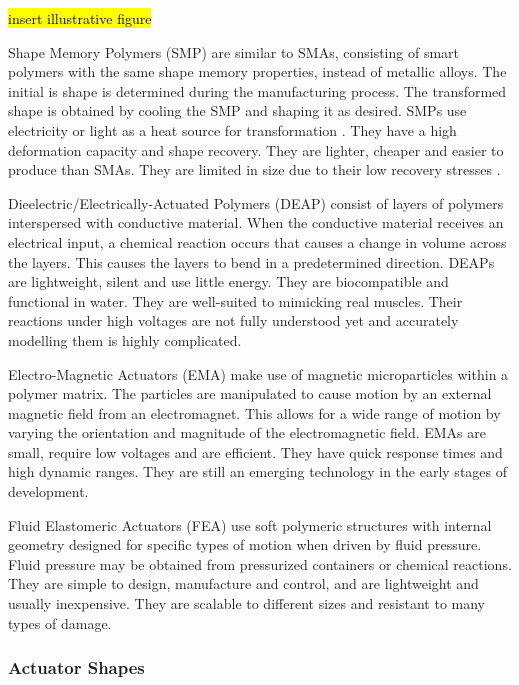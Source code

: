 \hl{insert illustrative figure}

Shape Memory Polymers (SMP) are similar to SMAs, consisting of smart polymers with the same shape memory properties, instead of metallic alloys. The initial is shape is determined during the manufacturing process. The transformed shape is obtained by cooling the SMP and shaping it as desired. SMPs use electricity or light as a heat source for transformation \cite{Behl2007}. They have a high deformation capacity and shape recovery. They are lighter, cheaper and easier to produce than SMAs. They are limited in size due to their low recovery stresses \cite{Rodriguez2016, Behl2007}.

Dieelectric/Electrically-Actuated Polymers (DEAP) consist of layers of polymers interspersed with conductive material. When the conductive material receives an electrical input, a chemical reaction occurs that causes a change in volume across the layers. This causes the layers to bend in a predetermined direction. DEAPs are lightweight, silent and use little energy. They are biocompatible and functional in water. They are well-suited to mimicking real muscles. Their reactions under high voltages are not fully understood yet and accurately modelling them is highly complicated. \cite{Mutlu2014}

Electro-Magnetic Actuators (EMA) make use of magnetic microparticles within a polymer matrix. The particles are manipulated to cause motion by an external magnetic field from an electromagnet. This allows for a wide range of motion by varying the orientation and magnitude of the electromagnetic field. EMAs are small, require low voltages and are efficient. They have quick response times and high dynamic ranges. They are still an emerging technology in the early stages of development. \cite{Do2018}

Fluid Elastomeric Actuators (FEA) use soft polymeric structures with internal geometry designed for specific types of motion when driven by fluid pressure. Fluid pressure may be obtained from pressurized containers or chemical reactions. They are simple to design, manufacture and control, and are lightweight and usually inexpensive. They are scalable to different sizes and resistant to many types of damage. \cite{Shepherd2011a,Onal2017}

\subsubsection{Actuator Shapes}

